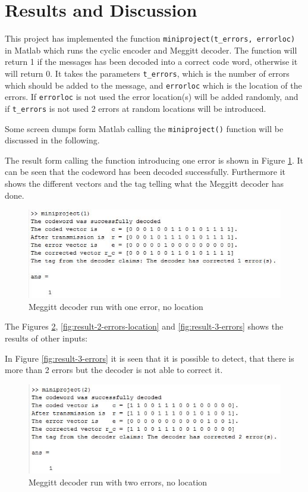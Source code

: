 \documentclass[Main]{subfiles}
\begin{document}
\section{Results and Discussion}
This project has implemented the function \texttt{miniproject(t\_errors, errorloc)} in Matlab which runs the cyclic encoder and Meggitt decoder.
The function will return 1 if the messages has been decoded into a correct code word, otherwise it will return 0.
It takes the parameters \texttt{t\_errors}, which is the number of errors which should be added to the message, and \texttt{errorloc} which is the location of the errors.
If \texttt{errorloc} is not used the error location(s) will be added randomly, and if \texttt{t\_errors} is not used 2 errors at random locations will be introduced. 

Some screen dumps form Matlab calling the \texttt{miniproject()} function will be discussed in the following.

The result form calling the function introducing one error is shown in Figure \ref{fig:result-1-errors}.
It can be seen that the codeword has been decoded successfully.
Furthermore it shows the different vectors and the tag telling what the Meggitt decoder has done. 

\begin{figure}[h!]
\centering
\includegraphics[width=0.7\linewidth]{./Picture/result-1-errors}
\caption{Meggitt decoder run with one error, no location}
\label{fig:result-1-errors}
\end{figure}

The Figures \ref{fig:result-2-errors}, \ref{fig:result-2-errors-location} and \ref{fig:result-3-errors} shows the results of other inputs:

In Figure \ref{fig:result-3-errors} it is seen that it is possible to detect, that there is more than 2 errors but the decoder is not able to correct it. 

\begin{figure}[h!]
\centering
\includegraphics[width=0.7\linewidth]{./Picture/result-2-errors}
\caption{Meggitt decoder run with two errors, no location}
\label{fig:result-2-errors}
\end{figure}
\end{document}
